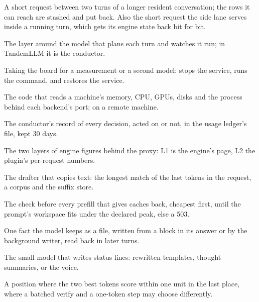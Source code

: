 \begin{description}[style=unboxed, leftmargin=0pt, itemsep=.5ex, font=\normalfont\bfseries]
\item[guest] A short request between two turns of a longer resident conversation; the rows it can reach are stashed and put back. Also the short request the side lane serves inside a running turn, which gets its engine state back bit for bit.

\item[harness] The layer around the model that plans each turn and watches it run; in TandemLLM it is the conductor.

\item[hold] Taking the board for a measurement or a second model:  stops the service, runs the command, and restores the service.

\item[host collector] The code that reads a machine's memory, CPU, GPUs, disks and the process behind each backend's port;  on a remote machine.

\item[journal] The conductor's record of every decision, acted on or not, in the usage ledger's file, kept 30 days.

\item[L1, L2] The two layers of engine figures behind the proxy: L1 is the engine's  page, L2 the plugin's per-request numbers.

\item[lookup drafter] The drafter that copies text: the longest match of the last tokens in the request, a corpus and the suffix store.

\item[memory gate] The check before every prefill that gives caches back, cheapest first, until the prompt's workspace fits under the declared peak, else a 503.

\item[memory note] One fact the model keeps as a file, written from a block in its answer or by the background writer, read back in later turns.

\item[narrator] The small model that writes status lines: rewritten templates, thought summaries, or the voice.

\item[near tie] A position where the two best tokens score within one unit in the last place, where a batched verify and a one-token step may choose differently.


\end{description}
